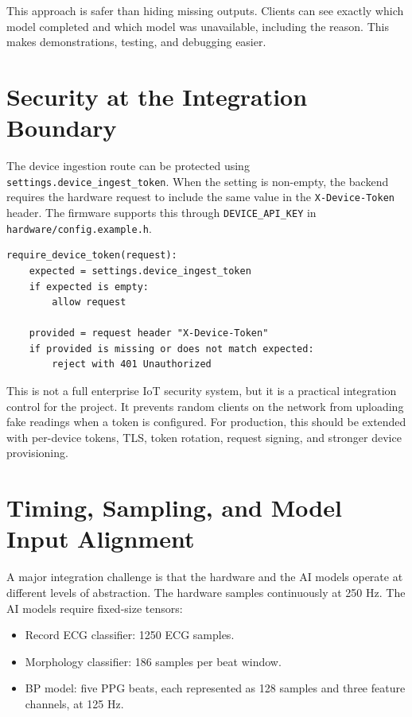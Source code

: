 This approach is safer than hiding missing outputs. Clients can see exactly which model completed and which model was unavailable, including the reason. This makes demonstrations, testing, and debugging easier.

\section{Security at the Integration Boundary}

The device ingestion route can be protected using \texttt{settings.device\_ingest\_token}. When the setting is non-empty, the backend requires the hardware request to include the same value in the \texttt{X-Device-Token} header. The firmware supports this through \texttt{DEVICE\_API\_KEY} in \texttt{hardware/config.example.h}.

\begin{lstlisting}[caption={Pseudocode for optional device-token protection}]
require_device_token(request):
    expected = settings.device_ingest_token
    if expected is empty:
        allow request

    provided = request header "X-Device-Token"
    if provided is missing or does not match expected:
        reject with 401 Unauthorized
\end{lstlisting}

This is not a full enterprise IoT security system, but it is a practical integration control for the project. It prevents random clients on the network from uploading fake readings when a token is configured. For production, this should be extended with per-device tokens, TLS, token rotation, request signing, and stronger device provisioning.

\section{Timing, Sampling, and Model Input Alignment}

A major integration challenge is that the hardware and the AI models operate at different levels of abstraction. The hardware samples continuously at 250 Hz. The AI models require fixed-size tensors:

\begin{itemize}
    \item Record ECG classifier: 1250 ECG samples.
    \item Morphology classifier: 186 samples per beat window.
    \item BP model: five PPG beats, each represented as 128 samples and three feature channels, at 125 Hz.
\end{itemize}

